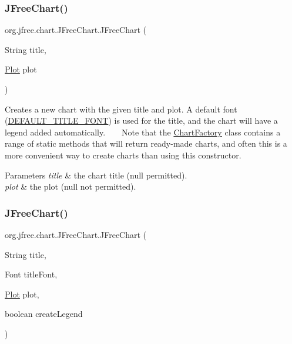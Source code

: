 \subsubsection{\texorpdfstring{J\+Free\+Chart()}{JFreeChart()}\hspace{0.1cm}{\footnotesize\ttfamily [2/3]}}
{\footnotesize\ttfamily org.\+jfree.\+chart.\+J\+Free\+Chart.\+J\+Free\+Chart (\begin{DoxyParamCaption}\item[{String}]{title,  }\item[{\mbox{\hyperlink{classorg_1_1jfree_1_1chart_1_1plot_1_1_plot}{Plot}}}]{plot }\end{DoxyParamCaption})}

Creates a new chart with the given title and plot. A default font (\mbox{\hyperlink{classorg_1_1jfree_1_1chart_1_1_j_free_chart_a640aa4dd676620a36764874737b77706}{D\+E\+F\+A\+U\+L\+T\+\_\+\+T\+I\+T\+L\+E\+\_\+\+F\+O\+NT}}) is used for the title, and the chart will have a legend added automatically. ~\newline
~\newline
 Note that the \mbox{\hyperlink{classorg_1_1jfree_1_1chart_1_1_chart_factory}{Chart\+Factory}} class contains a range of static methods that will return ready-\/made charts, and often this is a more convenient way to create charts than using this constructor.


\begin{DoxyParams}{Parameters}
{\em title} & the chart title ({\ttfamily null} permitted). \\
\hline
{\em plot} & the plot ({\ttfamily null} not permitted). \\
\hline
\end{DoxyParams}
\mbox{\label{classorg_1_1jfree_1_1chart_1_1_j_free_chart_ae7347713dca5fafd5eca60739e6ffc66}} 
\subsubsection{\texorpdfstring{J\+Free\+Chart()}{JFreeChart()}\hspace{0.1cm}{\footnotesize\ttfamily [3/3]}}
{\footnotesize\ttfamily org.\+jfree.\+chart.\+J\+Free\+Chart.\+J\+Free\+Chart (\begin{DoxyParamCaption}\item[{String}]{title,  }\item[{Font}]{title\+Font,  }\item[{\mbox{\hyperlink{classorg_1_1jfree_1_1chart_1_1plot_1_1_plot}{Plot}}}]{plot,  }\item[{boolean}]{create\+Legend }\end{DoxyParamCaption})}

